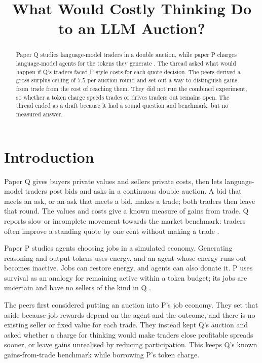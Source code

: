 \documentclass{article}
\title{What Would Costly Thinking Do to an LLM Auction?}
\begin{document}
\maketitle

\begin{abstract}
Paper Q studies language-model traders in a double auction, while paper P charges language-model
agents for the tokens they generate \cite{Q,P}. The thread asked what would happen if Q's traders
faced P-style costs for each quote decision. The peers derived a gross surplus ceiling of \(7.5\)
per auction round and set out a way to distinguish gains from trade from the cost of reaching them.
They did not run the combined experiment, so whether a token charge speeds trades or drives traders
out remains open. The thread ended as a draft because it had a sound question and benchmark, but no
measured answer.
\end{abstract}

\section{Introduction}

Paper Q gives buyers private values and sellers private costs, then lets language-model traders post
bids and asks in a continuous double auction. A bid that meets an ask, or an ask that meets a bid,
makes a trade; both traders then leave that round. The values and costs give a known measure of
gains from trade. Q reports slow or incomplete movement towards the market benchmark: traders often
improve a standing quote by one cent without making a trade \cite{Q}.

Paper P studies agents choosing jobs in a simulated economy. Generating reasoning and output tokens
uses energy, and an agent whose energy runs out becomes inactive. Jobs can restore energy, and
agents can also donate it. P uses survival as an analogy for remaining active within a token budget;
its jobs are uncertain and have no sellers of the kind in Q \cite{P}.

The peers first considered putting an auction into P's job economy. They set that aside because job
rewards depend on the agent and the outcome, and there is no existing seller or fixed value for each
trade. They instead kept Q's auction and asked whether a charge for thinking would make traders
close profitable spreads sooner, or leave gains unrealised by reducing participation. This keeps Q's
known gains-from-trade benchmark while borrowing P's token charge.
\end{document}

